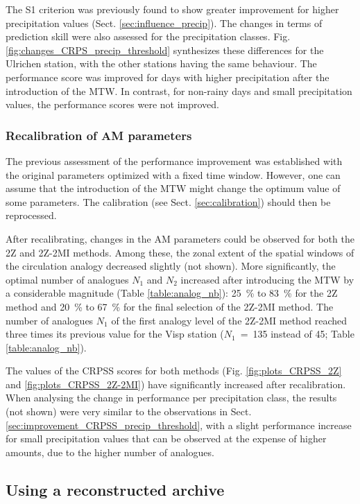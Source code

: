\documentclass[hess, manuscript]{copernicus}
\begin{document}
	The S1 criterion was previously found to show greater improvement for higher precipitation values (Sect. \ref{sec:influence_precip}). The changes in terms of prediction skill were also assessed for the precipitation classes. Fig. \ref{fig:changes_CRPS_precip_threshold} synthesizes these differences for the Ulrichen station, with the other stations having the same behaviour. The performance score was improved for days with higher precipitation after the introduction of the MTW. In contrast, for non-rainy days and small precipitation values, the performance scores were not improved.
	
	
	\subsubsection{Recalibration of AM parameters}
	\label{sec:recalibration}
	
	The previous assessment of the performance improvement was established with the original parameters optimized with a fixed time window. However, one can assume that the introduction of the MTW might change the optimum value of some parameters. The calibration (see Sect. \ref{sec:calibration}) should then be reprocessed.
	
	After recalibrating, changes in the AM parameters could be observed for both the 2Z and 2Z-2MI methods. Among these, the zonal extent of the spatial windows of the circulation analogy decreased slightly (not shown). More significantly, the optimal number of analogues $N_{1}$ and $N_{2}$ increased after introducing the MTW by a considerable magnitude (Table \ref{table:analog_nb}): 25~\% to 83~\% for the 2Z method and 20~\% to 67~\% for the final selection of the 2Z-2MI method. The number of analogues $N_{1}$ of the first analogy level of the 2Z-2MI method reached three times its previous value for the Visp station ($N_{1}$~=~135 instead of 45; Table \ref{table:analog_nb}). 
	
	The values of the CRPSS scores for both methods (Fig. \ref{fig:plots_CRPSS_2Z} and \ref{fig:plots_CRPSS_2Z-2MI}) have significantly increased after recalibration. When analysing the change in performance per precipitation class, the results (not shown) were very similar to the observations in Sect. \ref{sec:improvement_CRPSS_precip_threshold}, with a slight performance increase for small precipitation values that can be observed at the expense of higher amounts, due to the higher number of analogues.
	
	
	\subsection{Using a reconstructed archive}
	\label{sec:reconstruction_results}
	
\end{document}
